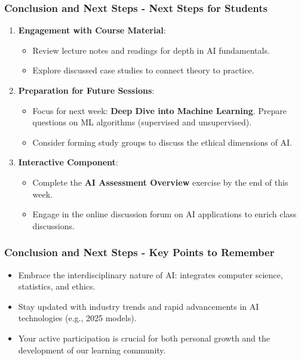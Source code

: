 \documentclass[aspectratio=169]{beamer}
\begin{document}
\begin{frame}[fragile]
    \frametitle{Conclusion and Next Steps - Next Steps for Students}
    \begin{enumerate}
        \item \textbf{Engagement with Course Material}:
        \begin{itemize}
            \item Review lecture notes and readings for depth in AI fundamentals.
            \item Explore discussed case studies to connect theory to practice.
        \end{itemize}

        \item \textbf{Preparation for Future Sessions}:
        \begin{itemize}
            \item Focus for next week: \textbf{Deep Dive into Machine Learning}. Prepare questions on ML algorithms (supervised and unsupervised).
            \item Consider forming study groups to discuss the ethical dimensions of AI.
        \end{itemize}

        \item \textbf{Interactive Component}:
        \begin{itemize}
            \item Complete the \textbf{AI Assessment Overview} exercise by the end of this week.
            \item Engage in the online discussion forum on AI applications to enrich class discussions.
        \end{itemize}
    \end{enumerate}
\end{frame}

\begin{frame}[fragile]
    \frametitle{Conclusion and Next Steps - Key Points to Remember}
    \begin{itemize}
        \item Embrace the interdisciplinary nature of AI: integrates computer science, statistics, and ethics.
        \item Stay updated with industry trends and rapid advancements in AI technologies (e.g., 2025 models).
        \item Your active participation is crucial for both personal growth and the development of our learning community.
    \end{itemize}
\end{frame}
\end{document}
